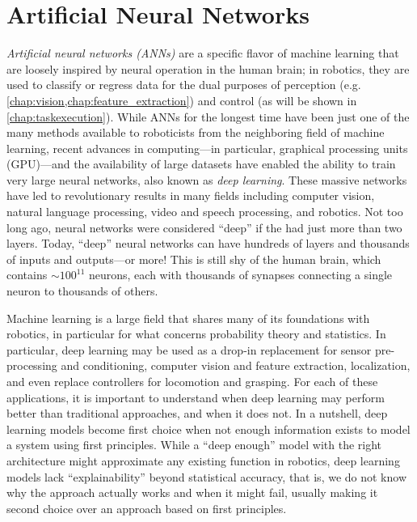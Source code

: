 \chapter{Artificial Neural Networks}\label{chap:ann}

\textsl{Artificial neural networks (ANNs)} are a specific flavor of machine learning that are loosely inspired by neural operation in the human brain; in robotics, they are used to classify or regress data for the dual purposes of perception (e.g. \cref{chap:vision,chap:feature_extraction}) and control (as will be shown in \cref{chap:taskexecution}).
%
While ANNs for the longest time have been just one of the many methods available to roboticists from the neighboring field of machine learning, recent advances in computing---in particular, graphical processing units (GPU)---and the availability of large datasets have enabled the ability to train very large neural networks, also known as \textsl{deep learning}. These massive networks have led to revolutionary results in many fields including computer vision, natural language processing, video and speech processing, and robotics.
%
Not too long ago, neural networks were considered ``deep'' if the had just more than two layers. Today, ``deep'' neural networks can have hundreds of layers and thousands of inputs and outputs---or more!
This is still shy of the human brain, which contains $\sim 100^{11}$ neurons, each with thousands of synapses connecting a single neuron to thousands of others.

\begin{mdframed}
\end{mdframed}

Machine learning is a large field that shares many of its foundations with robotics, in particular for what concerns probability theory and statistics. In particular, deep learning may be used as a drop-in replacement for sensor pre-processing and conditioning, computer vision and feature extraction, localization, and even replace controllers for locomotion and grasping.
For each of these applications, it is important to understand when deep learning may perform better than traditional approaches, and when it does not.
In a nutshell, deep learning models become first choice when not enough information exists to model a system using first principles. While a ``deep enough'' model with the right architecture might approximate any existing function in robotics, deep learning models lack ``explainability'' beyond statistical accuracy, that is, we do not know why the approach actually works and when it might fail, usually making it second choice over an approach based on first principles.


